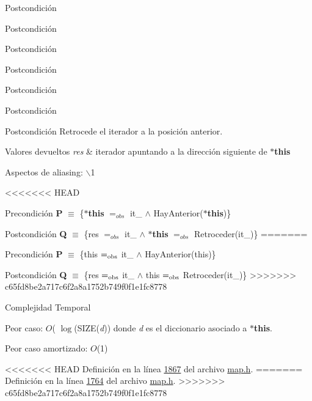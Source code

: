 \begin{Indent}
\begin{DoxyPostcond}{\-Postcondición}
\begin{DoxyPostcond}{\-Postcondición}
\begin{DoxyPostcond}{\-Postcondición}
\begin{DoxyPostcond}{\-Postcondición}
\begin{DoxyPostcond}{\-Postcondición}
\begin{DoxyPostcond}{\-Postcondición}
\begin{DoxyPostcond}{\-Postcondición}
\-Retrocede el iterador a la posición anterior. 


\begin{DoxyRetVals}{\-Valores devueltos}
{\em res} & iterador apuntando a la dirección siguiente de {\bfseries $\ast$this}\\
\hline
\end{DoxyRetVals}
\begin{DoxyParagraph}{\-Aspectos de aliasing\-:}
$\backslash$1
\end{DoxyParagraph}
<<<<<<< HEAD
\begin{DoxyPrecond}{\-Precondición}
{\bfseries \-P} $\equiv$ \{{\bfseries $\ast$this} $=_{obs}$ it\-\_ $\land$ \-Hay\-Anterior({\bfseries $\ast$this})\} 
\end{DoxyPrecond}
\begin{DoxyPostcond}{\-Postcondición}
{\bfseries \-Q} $\equiv$ \{res $=_{obs}$ it\-\_ $\land$ {\bfseries $\ast$this} $=_{obs}$ \-Retroceder(it\-\_)\}
=======
\begin{DoxyPrecond}{Precondición}
{\bfseries P} $\equiv$ \{this $=_{\rm obs}$ it\+\_ $\land$ Hay\+Anterior(this)\} 
\end{DoxyPrecond}
\begin{DoxyPostcond}{Postcondición}
{\bfseries Q} $\equiv$ \{res $=_{\rm obs}$ it\+\_ $\land$ this $=_{\rm obs}$ Retroceder(it\+\_)\}
>>>>>>> c65fd8be2a717c6f2a8a1752b749f0f1e1fc8778
\end{DoxyPostcond}

\begin{DoxyDescription}
\item[\-Complejidad \-Temporal]
\begin{DoxyItemize}
\item \-Peor caso\-: $O$( $\log$(\-S\-I\-Z\-E({\itshape d\/})) donde {\itshape d\/} es el diccionario asociado a {\bfseries $\ast$this}.
\item \-Peor caso amortizado\-: $O$(1) 
\end{DoxyItemize}
\end{DoxyDescription}

<<<<<<< HEAD
\-Definición en la línea \hyperlink{map_8h_source_l01867}{1867} del archivo \hyperlink{map_8h_source}{map.\-h}.
=======
Definición en la línea \hyperlink{map_8h_source_l01764}{1764} del archivo \hyperlink{map_8h_source}{map.\+h}.
>>>>>>> c65fd8be2a717c6f2a8a1752b749f0f1e1fc8778

\hypertarget{classaed2_1_1map_1_1iterator_ad052c1ef8477a1613c292202226053a5_ad052c1ef8477a1613c292202226053a5}{
}
\end{DoxyPostcond}
\end{DoxyPostcond}
\end{DoxyPostcond}
\end{DoxyPostcond}
\end{DoxyPostcond}
\end{DoxyPostcond}
\end{DoxyPostcond}
\end{DoxyPostcond}
\end{Indent}
